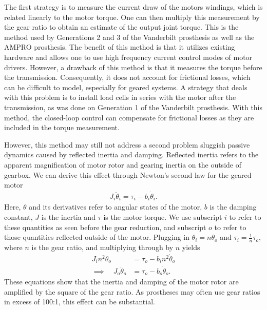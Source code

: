 The first strategy is to measure the current draw of the motors windings, which
is related linearly to the motor torque. One can then multiply this measurement
by the gear ratio to obtain an estimate of the output joint torque. This is the
method used by Generations 2 and 3 of the Vanderbilt prosthesis as well as the
AMPRO prosthesis. The benefit of this method is that it utilizes existing
hardware and allows one to use high frequency current control modes of motor
drivers. However, a drawback of this method is that it measures the torque
before the transmission. Consequently, it does not account for frictional
losses, which can be difficult to model, especially for geared systems. A
strategy that deals with this problem is to install load cells in series with
the motor after the transmission, as was done on Generation 1 of the Vanderbilt
prosthesis. With this method, the closed-loop control can compensate for
frictional losses as they are included in the torque measurement. 

However, this method may still not address a second problem sluggish passive
dynamics caused by reflected inertia and damping. Reflected inertia refers to
the apparent magnification of motor rotor and gearing inertia on the outside of
gearbox.  We can derive this effect through Newton's second law for the geared
motor
\begin{align}
    J_i \ddot{\theta}_i = \tau_i - b_i \dot{\theta}_i.
\end{align}
Here, $\theta$ and its derivatives refer to angular states of the motor, $b$
is the damping constant, $J$ is the inertia and $\tau$ is the motor torque. We
use subscript $i$ to refer to these quantities as seen before the gear
reduction, and subscript $o$ to refer to those quantities reflected outside of
the motor. Plugging in $\theta_i = n \theta_o$ and $\tau_i = \frac{1}{n}
\tau_o$, where $n$ is the gear ratio, and multiplying through by $n$ yields
\begin{align}
    J_i n^2 \ddot{\theta}_o &= \tau_o - b_i n^2 \dot{\theta}_o \\
    \implies \quad J_o \ddot{\theta}_o &= \tau_o - b_o \dot{\theta}_o.
\end{align}
These equations show that the inertia and damping of the motor rotor are
amplified by the square of the gear ratio. As prostheses may often use gear
ratios in excess of 100:1, this effect can be substantial. 

